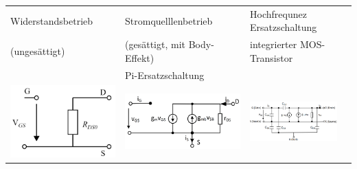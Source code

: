 \begin{tabular}{| l | l | l | l |}
    \hline
    Widerstandsbetrieb   & Stromquelllenbetrieb          & Hochfrequnez Ersatzschaltung \\
    (ungesättigt)        & (gesättigt, mit Body-Effekt)  & integrierter MOS-Transistor \\
    \hline
     & Pi-Ersatzschaltung  & \\
    \includegraphics[width=0.2\linewidth]{Widerstandsbetrieb_Schaltung.png} & \includegraphics[width=0.3\linewidth]{PI_Niederfrequnz_Kleinsignal.png}  & \includegraphics[width=0.3\linewidth]{Hochfrequnzbetrieb_Schaltung.png} \\
    \hline
\end{tabular}
